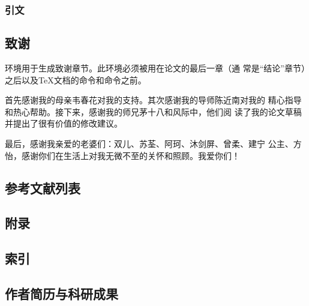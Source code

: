 \subsubsection{引文}


\subsection{致谢}

环境用于生成致谢章节。此环境必须被用在论文的最后一章（通
常是“结论”章节）之后以及{\TeX}文档的命令和命令之前。

\begin{tex}
\begin{acknowledgement}
首先感谢我的母亲韦春花对我的支持。其次感谢我的导师陈近南对我的
精心指导和热心帮助。接下来，感谢我的师兄茅十八和风际中，他们阅
读了我的论文草稿并提出了很有价值的修改建议。

最后，感谢我亲爱的老婆们：双儿、苏荃、阿珂、沐剑屏、曾柔、建宁
公主、方怡，感谢你们在生活上对我无微不至的关怀和照顾。我爱你们！
\end{acknowledgement}
\end{tex}

\subsection{参考文献列表}

\subsection{附录}

\subsection{索引}

\subsection{作者简历与科研成果}

